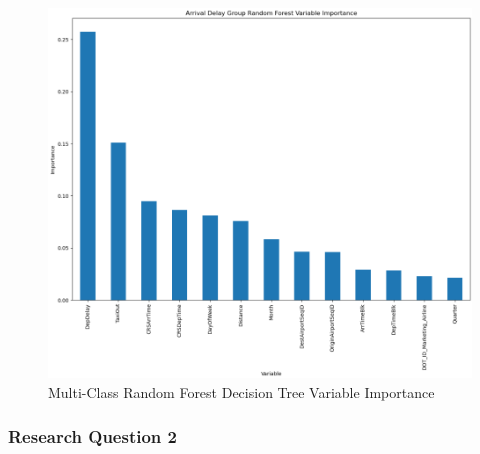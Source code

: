 \documentclass[a4paper,12pt]{article}
\begin{document}
\begin{figure}[!]
    \centering
    \includegraphics*[scale=.50]{../../img/model_rq1_rf_2.png}
    \caption[]{Multi-Class Random Forest Decision Tree Variable Importance}
    \label{fig:model:rq1:rfc_2}
\end{figure}

\FloatBarrier

\subsubsection{Research Question 2}
\end{document}
